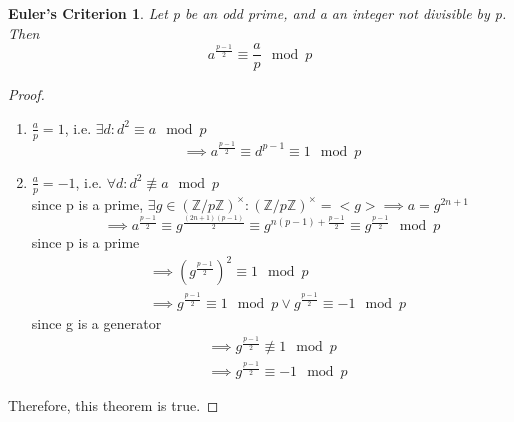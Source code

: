 \documentclass{article}
\newtheorem*{thm}{Euler's Criterion}
\theoremstyle{definition}\newtheorem{definition}{Definition}
\begin{document}
	\begin{thm}
		Let p be an odd prime, and a an integer not divisible by p. Then $$a^{\frac{p-1}{2}}\equiv \frac{a}{p}\mod p$$
	\end{thm}	
	
	\begin{proof} \
		\begin{enumerate}
			\item $\frac{a}{p}=1$, i.e. $\exists d : d^2 \equiv a \mod p$
				$$\implies a^{\frac{p-1}{2}} \equiv d^{p-1} \equiv 1 \mod p$$
			\item $\frac{a}{p}=-1$, i.e. $\forall d : d^2 \not\equiv a \mod p$\\
				since p is a prime, $\exists g \in (\mathbb Z/p\mathbb Z)^\times:(\mathbb Z/p\mathbb Z)^\times= <g>\implies a=g^{2n+1}$\\
				$$\implies a^{\frac{p-1}{2}} \equiv g^{\frac{(2n+1)(p-1)}{2}}\equiv g^{n(p-1)+\frac{p-1}{2}} \equiv g^\frac{p-1}{2} \mod p$$
				since p is a prime
				\begin{align*}
					&\implies (g^\frac{p-1}{2})^2 \equiv 1 \mod p \\
					&\implies g^\frac{p-1}{2}\equiv1 \mod p \lor g^\frac{p-1}{2}\equiv-1 \mod p
				\end{align*}
				since g is a generator
				\begin{align*}
					&\implies g^\frac{p-1}{2}\not\equiv1 \mod p\\
					&\implies g^\frac{p-1}{2} \equiv -1 \mod p
				\end{align*} 
 		\end{enumerate}
 		Therefore, this theorem is true.
	\end{proof}
			
\end{document}
